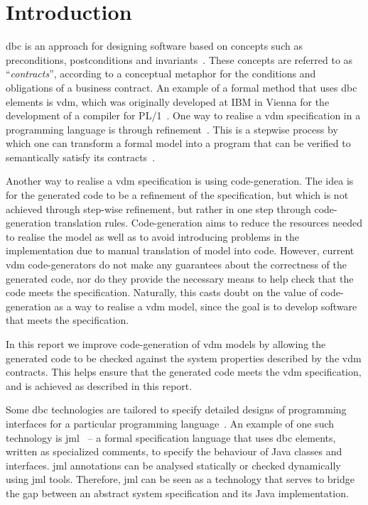 \section{Introduction}
\label{sec:intro}

\ac{dbc} is an approach for designing software based on concepts such
as preconditions, postconditions and invariants~\cite{Meyer88}. These
concepts are referred to as ``\emph{contracts}'', according to a
conceptual metaphor for the conditions and obligations of a business
contract. An example of a formal method that uses \ac{dbc} elements is
\ac{vdm}, which was originally developed at IBM in Vienna for the
development of a compiler for
PL/1~\cite{Bjorner&78,Fitzgerald&08c,Fitzgerald&09}. One way to
realise a \ac{vdm} specification in a programming language is through
refinement~\cite{Woodcock&96}. This is a stepwise process by which one
can transform a formal model into a program that can be verified to
semantically satisfy its contracts~\cite{SDRA}.

Another way to realise a \ac{vdm} specification is using
code-generation. The idea is for the generated code to be a refinement
of the specification, but which is not achieved through step-wise
refinement, but rather in one step through code-generation translation
rules. Code-generation aims to reduce the resources needed to realise
the model as well as to avoid introducing problems in the
implementation due to manual translation of model into code. However,
current \ac{vdm} code-generators do not make any guarantees about the
correctness of the generated code, nor do they provide the necessary
means to help check that the code meets the specification. Naturally,
this casts doubt on the value of code-generation as a way to realise a
\ac{vdm} model, since the goal is to develop software that meets the
specification.

In this report we improve code-generation of \ac{vdm} models by
allowing the generated code to be checked against the system
properties described by the \ac{vdm} contracts. This helps ensure that
the generated code meets the \ac{vdm} specification, and is achieved
as described in this report.

Some \ac{dbc} technologies are tailored to specify detailed designs of
programming interfaces for a particular programming
language~\cite{Wing87}. An example of one such technology is
\ac{jml}~\cite{Burdy&05} -- a formal specification language that uses
\ac{dbc} elements, written as specialized comments, to specify the
behaviour of Java classes and interfaces. \ac{jml} annotations can be
analysed statically or checked dynamically using \ac{jml} tools.
Therefore, \ac{jml} can be seen as a technology that serves to bridge
the gap between an abstract system specification and its Java
implementation.

